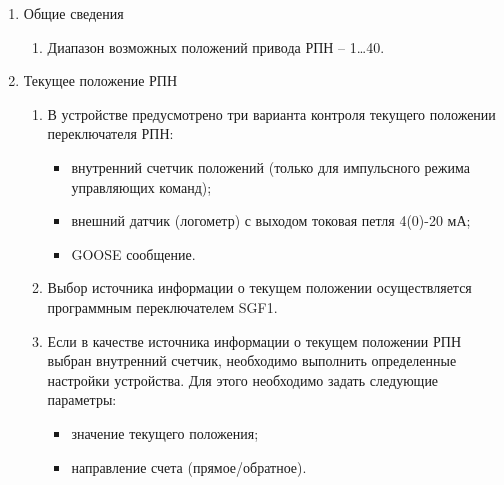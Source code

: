 
\color{black}

\begin{enumerate}


\item Общие сведения

\begin{enumerate}

\item Диапазон возможных положений привода РПН – 1…40.


\end{enumerate}


\item\label{tekush} Текущее положение РПН

\begin{enumerate}

\item В устройстве предусмотрено три варианта контроля текущего положении переключателя РПН:
\begin{itemize}
\item внутренний счетчик положений (только для импульсного режима управляющих команд);
\item внешний датчик (логометр) с выходом токовая петля 4(0)-20 мА;
\item GOOSE сообщение.
\end{itemize}

\item
Выбор источника информации о текущем положении осуществляется программным переключателем SGF1. 

\item Если в качестве источника информации о текущем положении РПН выбран внутренний счетчик, необходимо выполнить определенные настройки устройства. Для этого необходимо задать следующие параметры:
\begin{itemize}
\item значение текущего положения;
\item направление счета (прямое/обратное).
\end{itemize}


\end{enumerate}
\end{enumerate}

